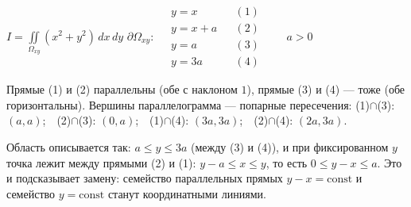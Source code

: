 

\begin{shapka}
$\displaystyle I=\iint\limits_{\Omega_{xy}}(x^2+y^2)\,dx\,dy$
\tcblower
$\partial\Omega_{xy}:\quad
\begin{array}{lll}
y=x & & (1)\\
y=x+a & & (2)\\
y=a & & (3)\\
y=3a & & (4)
\end{array}\qquad a>0$
\end{shapka}

Прямые (1) и (2) параллельны (обе с наклоном $1$), прямые (3) и (4) --- тоже (обе горизонтальны). Вершины параллелограмма --- попарные пересечения:
(1)$\cap$(3): $(a,a)$;\ \ (2)$\cap$(3): $(0,a)$;\ \ (1)$\cap$(4): $(3a,3a)$;\ \ (2)$\cap$(4): $(2a,3a)$.

Область описывается так: $a\leqslant y\leqslant 3a$ (между (3) и (4)), и при фиксированном $y$ точка лежит между прямыми (2) и (1): $y-a\leqslant x\leqslant y$, то есть $0\leqslant y-x\leqslant a$. Это и подсказывает замену: семейство параллельных прямых $y-x=\mathrm{const}$ и семейство $y=\mathrm{const}$ станут координатными линиями.

